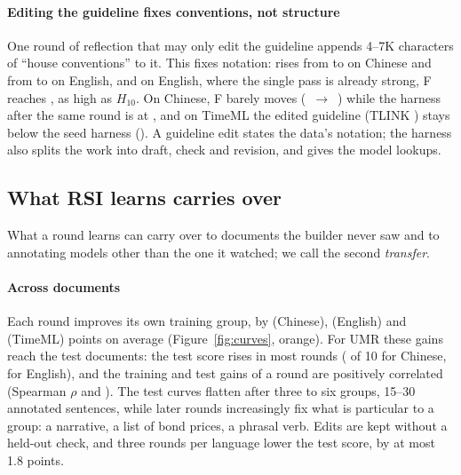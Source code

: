 \paragraph{Editing the guideline fixes conventions, not structure} One round of reflection that may only edit the guideline appends 4--7K characters of ``house conventions'' to it. This fixes notation: \jumach{} rises from \ctlPromptJumachZh{} to \ctlGuideOneJumachZh{} on Chinese and from \ctlPromptJumachEn{} to \ctlGuideOneJumachEn{} on English, and on English, where the single pass is already strong, F reaches \ctlGuideOneEn{}, as high as $H_{10}$. On Chinese, F barely moves (\ctlPromptZh{}~$\rightarrow$~\ctlGuideOneZh{}) while the harness after the same round is at \ctlHarnessOneZh{}, and on TimeML the edited guideline (TLINK \ctlGuideOneTml{}) stays below the seed harness (\ctlSeedTml{}). A guideline edit states the data's notation; the harness also splits the work into draft, check and revision, and gives the model lookups.

\subsection{What RSI learns carries over}
\label{sec:general}

What a round learns can carry over to documents the builder never saw and to annotating models other than the one it watched; we call the second \emph{transfer}.

\paragraph{Across documents} Each round improves its own training group, by \trainGainZh{} (Chinese), \trainGainEn{} (English) and \trainGainTml{} (TimeML) points on average (Figure~\ref{fig:curves}, orange). For UMR these gains reach the test documents: the test score rises in most rounds (\roundsTestUpZh{} of 10 for Chinese, \roundsTestUpEn{} for English), and the training and test gains of a round are positively correlated (Spearman $\rho$ \genRhoZh{} and \genRhoEn{}). The test curves flatten after three to six groups, 15--30 annotated sentences, while later rounds increasingly fix what is particular to a group: a narrative, a list of bond prices, a phrasal verb. Edits are kept without a held-out check, and three rounds per language lower the test score, by at most 1.8 points.

